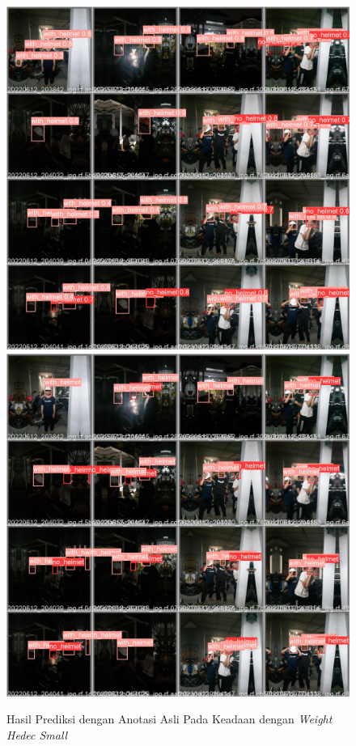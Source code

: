 \begin{figure}[ht]
  \centering
  \includegraphics[scale=0.1]{gambar/train_v2_val/low_ligjt/customSmall/val_batch0_pred.jpg}
  \includegraphics[scale=0.1]{gambar/train_v2_val/low_ligjt/customSmall/val_batch0_labels.jpg}
  \caption{Hasil Prediksi dengan Anotasi Asli Pada Keadaan dengan \emph{Weight Hedec Small}}
\end{figure}

